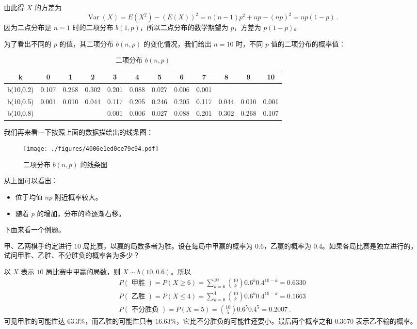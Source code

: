 由此得 $X $ 的方差为
\begin{equation}
\operatorname{Var}(X)=E\left(X^{2}\right)-(E(X))^{2}=n(n-1) p^{2}+n p-(n p)^{2}=n p(1-p)~.
\end{equation}
因为二点分布是 $n=1$ 时的二项分布 $b(1,p)$，所以二点分布的数学期望为 $p$，方差为 $p(1-p)$。

为了看出不同的 $p $ 的值，其二项分布 $b(n ,p) $ 的变化情况，我们给出 $n=10$ 时，不同 $p $ 值的二项分布的概率值：
\begin{table}[ht]
\centering
\caption{二项分布 $b(n, p)$}\label{tab_BiDist_1}
\begin{tabular}{|c|c|c|c|c|c|c|c|c|c|c|c|}
\hline
k & 0 & 1 & 2 & 3 & 4 & 5 & 6 & 7 & 8 & 9 & 10 \\
\hline
b(10,0.2) & 0.107 & 0.268 & 0.302 & 0.201 & 0.088 & 0.027 & 0.006 & 0.001 & & & \\
\hline
b(10,0.5) & 0.001 & 0.010 & 0.044 & 0.117 & 0.205 & 0.246 & 0.205 & 0.117 & 0.044 & 0.010 & 0.001 \\
\hline
b(10,0.8) & & & & 0.001 & 0.006 & 0.027 & 0.088 & 0.201 & 0.302 & 0.268 & 0.107 \\
\hline
\end{tabular}
\end{table}
我们再来看一下按照上面的数据描绘出的线条图：
\begin{figure}[ht]
\centering
\texttt{[image: ./figures/4006e1ed0ce79c94.pdf]}
\caption{二项分布 $b(n,p)$ 的线条图} \label{fig_BiDist_1}
\end{figure}

从上图可以看出：
\begin{itemize}
\item 位于均值 $np$ 附近概率较大。
\item 随着 $p $ 的增加，分布的峰逐渐右移。
\end{itemize}

下面来看一个例题。
\begin{example}{}
甲、乙两棋手约定进行 $10 $ 局比赛，以赢的局数多者为胜。设在每局中甲赢的概率为 $0.6$，乙赢的概率为 $0. 4$。如果各局比赛是独立进行的，试问甲胜、乙胜、不分胜负的概率各为多少？

以 $X $ 表示 $10 $ 局比赛中甲赢的局数，则 $X\sim b(10,0. 6)$。所以
\begin{equation}
\begin{aligned}P(\text { 甲胜 })=P(X \geqslant 6)=\sum_{k=6}^{10}\binom{10}{k} 0.6^{k} 0.4^{10-k}=0.6330 \\ P(\text { 乙胜 })=P(X \leqslant 4)=\sum_{k=0}^{4}\binom{10}{k} 0.6^{k} 0.4^{10-k}=0.1663 \\ P(\text { 不分胜负 })=P(X=5)=\binom{10}{5} 0.6^{5} 0.4^{5}=0.2007~.\end{aligned}
\end{equation}
可见甲胜的可能性达 $63. 3\%$，而乙胜的可能性只有 $16. 63\% $，它比不分胜负的可能性还要小。最后两个概率之和 $0. 367 0 $ 表示乙不输的概率。
\end{example}

